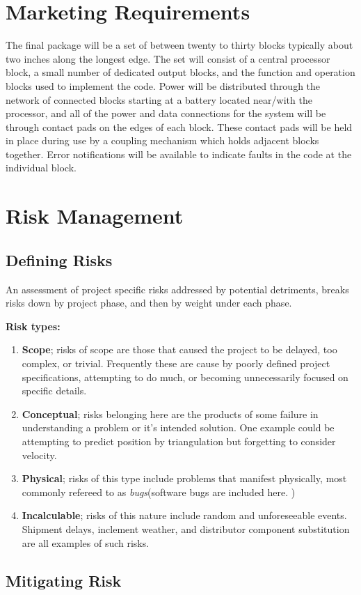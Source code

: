 \section{Marketing Requirements}
The final package will be a set of between twenty to thirty blocks typically about two inches along the longest edge. The set will consist of a central processor block, a small number of dedicated output blocks, and the function and operation blocks used to implement the code. Power will be distributed through the network of connected blocks starting at a battery located near/with the processor, and all of the power and data connections for the system will be through contact pads on the edges of each block. These contact pads will be held in place during use by a coupling mechanism which holds adjacent blocks together. Error notifications will be available to indicate faults in the code at the individual block.

\section{Risk Management}
\subsection{Defining Risks}
 An assessment of project specific risks addressed by potential detriments, breaks risks down by project phase, and then by weight under each phase.
 
 
 \hspace{.35cm} \textbf{Risk types:}
 \begin{enumerate}
 \item \textbf{Scope}; risks of scope are those that caused the project to be delayed, too complex, or trivial. Frequently these are cause by poorly defined project specifications, attempting to do much, or becoming unnecessarily focused on specific details.
 \item \textbf{Conceptual}; risks belonging here are the products of some failure in understanding a problem or it's intended solution. One example could be  attempting to predict position by triangulation but forgetting to consider velocity. 
 \item \textbf{Physical}; risks of this type include problems that manifest physically, most commonly refereed to as \textit{bugs}(software bugs are included here. )
 \item \textbf{Incalculable}; risks of this nature include random and unforeseeable events. Shipment delays, inclement weather, and distributor component substitution are all examples of such risks.
 \end{enumerate}
 \subsection{Mitigating Risk}
 
